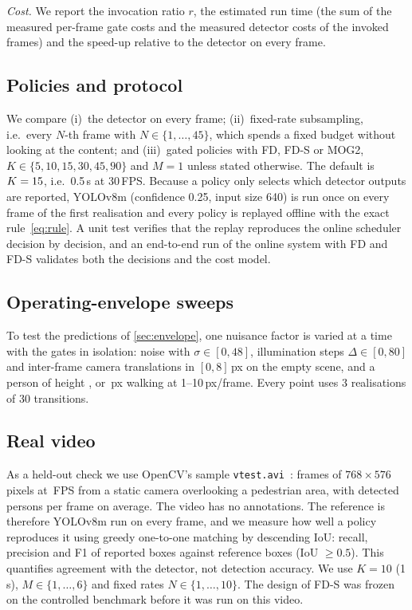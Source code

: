 \documentclass[12pt,a4paper]{article}
\theoremstyle{plain}
\theoremstyle{definition}
\newcommand{\code}[1]{\texttt{#1}}
\newcommand{\FD}{FD}
\newcommand{\FDS}{FD-S}
\begin{document}
\emph{Cost.} We report the invocation ratio $r$, the estimated run time (the sum of the measured per-frame gate costs and the measured detector costs of the invoked frames) and the speed-up relative to the detector on every frame.

\subsection{Policies and protocol}\label{sec:protocol}
We compare (i)~the detector on every frame; (ii)~fixed-rate subsampling, i.e.\ every $N$-th frame with $N\in\{1,\dots,45\}$, which spends a fixed budget without looking at the content; and (iii)~gated policies with \FD, \FDS{} or MOG2, $K\in\{5,10,15,30,45,90\}$ and $M=1$ unless stated otherwise. The default is $K=15$, i.e.\ 0.5\,s at 30\,FPS. Because a policy only selects which detector outputs are reported, YOLOv8m (confidence 0.25, input size 640) is run once on every frame of the first realisation and every policy is replayed offline with the exact rule~\eqref{eq:rule}. A unit test verifies that the replay reproduces the online scheduler decision by decision, and an end-to-end run of the online system with \FD{} and \FDS{} validates both the decisions and the cost model.

\subsection{Operating-envelope sweeps}\label{sec:sweeps}
To test the predictions of \cref{sec:envelope}, one nuisance factor is varied at a time with the gates in isolation: noise with $\sigma\in[0,48]$, illumination steps $\Delta\in[0,80]$ and inter-frame camera translations in $[0,8]$\,px on the empty scene, and a person of height \HeightA, \HeightB{} or \HeightC\,px walking at 1--10\,px/frame. Every point uses 3 realisations of 30 transitions.

\subsection{Real video}\label{sec:video_setup}
As a held-out check we use OpenCV's sample \code{vtest.avi}~\cite{opencv2024vtest}: \VtFrames{} frames of $768\times576$ pixels at \VtFps\,FPS from a static camera overlooking a pedestrian area, with \VtPersons{} detected persons per frame on average. The video has no annotations. The reference is therefore YOLOv8m run on every frame, and we measure how well a policy reproduces it using greedy one-to-one matching by descending IoU: recall, precision and F1 of reported boxes against reference boxes (IoU $\ge0.5$). This quantifies agreement with the detector, not detection accuracy. We use $K=10$ (1\,s), $M\in\{1,\dots,6\}$ and fixed rates $N\in\{1,\dots,10\}$. The design of \FDS{} was frozen on the controlled benchmark before it was run on this video.
\end{document}
